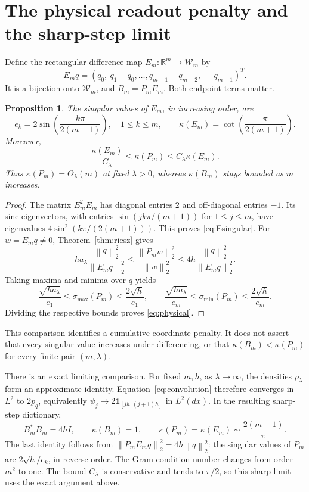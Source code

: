 \documentclass[11pt]{article}
\newtheorem{proposition}[theorem]{Proposition}
\theoremstyle{remark}
\newcommand{\R}{\mathbb R}
\newcommand{\norm}[1]{\left\lVert #1\right\rVert}
\begin{document}
\section{The physical readout penalty and the sharp-step limit}

Define the rectangular difference map $E_m:\R^m\to\mathcal W_m$ by
\[
 E_mq=(q_0,\ q_1-q_0,\ldots,q_{m-1}-q_{m-2},\ -q_{m-1})^T.
\]
It is a bijection onto $\mathcal W_m$, and
$B_m=P_mE_m$.  Both endpoint terms matter.

\begin{proposition}\label{prop:physical}
The singular values of $E_m$, in increasing order, are
\begin{equation}\label{eq:Esingular}
 e_k=2\sin\!\left(\frac{k\pi}{2(m+1)}\right),
 \quad 1\le k\le m,
 \qquad
 \kappa(E_m)=\cot\!\left(\frac{\pi}{2(m+1)}\right).
\end{equation}
Moreover,
\begin{equation}\label{eq:physical}
 \frac{\kappa(E_m)}{C_\lambda}
 \le\kappa(P_m)\le C_\lambda\kappa(E_m).
\end{equation}
Thus $\kappa(P_m)=\Theta_\lambda(m)$ at fixed $\lambda>0$, whereas
$\kappa(B_m)$ stays bounded as $m$ increases.
\end{proposition}

\begin{proof}
The matrix $E_m^TE_m$ has diagonal entries $2$ and off-diagonal entries
$-1$.  Its sine eigenvectors, with entries
$\sin(jk\pi/(m+1))$ for $1\le j\le m$, have eigenvalues
$4\sin^2(k\pi/(2(m+1)))$.  This proves \eqref{eq:Esingular}.
For $w=E_mq\ne0$, Theorem~\ref{thm:riesz} gives
\[
 h a_\lambda\frac{\norm q_2^2}{\norm{E_mq}_2^2}
 \le\frac{\norm{P_mw}_2^2}{\norm w_2^2}
 \le4h\frac{\norm q_2^2}{\norm{E_mq}_2^2}.
\]
Taking maxima and minima over $q$ yields
\[
 \frac{\sqrt{h a_\lambda}}{e_1}\le\sigma_{\max}(P_m)
 \le\frac{2\sqrt h}{e_1},
 \qquad
 \frac{\sqrt{h a_\lambda}}{e_m}\le\sigma_{\min}(P_m)
 \le\frac{2\sqrt h}{e_m}.
\]
Dividing the respective bounds proves \eqref{eq:physical}.
\end{proof}

This comparison identifies a cumulative-coordinate penalty.  It does
not assert that every singular value increases under differencing, or
that $\kappa(B_m)<\kappa(P_m)$ for every finite pair $(m,\lambda)$.

There is an exact limiting comparison.  For fixed $m,h$, as
$\lambda\to\infty$, the densities $\rho_\lambda$ form an approximate
identity.  Equation~\eqref{eq:convolution} therefore converges in $L^2$
to $2p_q$, equivalently
$\psi_j\to2\mathbf1_{[jh,(j+1)h]}$ in $L^2(dx)$.  In the resulting
sharp-step dictionary,
\begin{equation}\label{eq:step}
 B_m^*B_m=4hI,
 \qquad \kappa(B_m)=1,
 \qquad \kappa(P_m)=\kappa(E_m)
 \sim\frac{2(m+1)}{\pi}.
\end{equation}
The last identity follows from
$\norm{P_mE_mq}_2^2=4h\norm q_2^2$: the singular values of $P_m$
are $2\sqrt h/e_k$, in reverse order.  The Gram condition number
changes from order $m^2$ to one.  The bound $C_\lambda$ is conservative
and tends to $\pi/2$, so this sharp limit uses the exact argument above.
\end{document}
